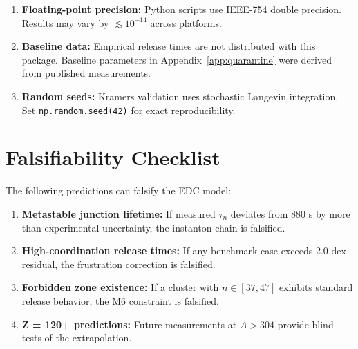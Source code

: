 \begin{enumerate}
    \item \textbf{Floating-point precision:} Python scripts use IEEE-754
          double precision. Results may vary by $\lesssim 10^{-14}$ across
          platforms.

    \item \textbf{Baseline data:} Empirical release times are not distributed
          with this package. Baseline parameters in Appendix~\ref{app:quarantine}
          were derived from published measurements.

    \item \textbf{Random seeds:} Kramers validation uses stochastic Langevin
          integration. Set \texttt{np.random.seed(42)} for exact reproducibility.
\end{enumerate}

\section{Falsifiability Checklist}
\label{sec:repro:falsify}

The following predictions can falsify the EDC model:

\begin{enumerate}
    \item \textbf{Metastable junction lifetime:} If measured $\tau_n$ deviates
          from 880 s by more than experimental uncertainty, the instanton
          chain is falsified.

    \item \textbf{High-coordination release times:} If any benchmark case
          exceeds 2.0 dex residual, the frustration correction is falsified.

    \item \textbf{Forbidden zone existence:} If a cluster with $n \in [37, 47]$
          exhibits standard release behavior, the M6 constraint is falsified.

    \item \textbf{Z = 120+ predictions:} Future measurements at $A > 304$
          provide blind tests of the extrapolation.
\end{enumerate}


